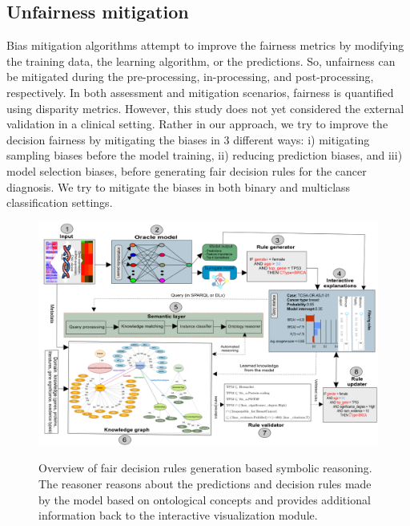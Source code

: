 \subsection{Unfairness mitigation}
Bias mitigation algorithms attempt to improve the fairness metrics by modifying the training data, the learning algorithm, or the predictions. So, unfairness can be mitigated during the pre-processing, in-processing, and post-processing, respectively.  
In both assessment and mitigation scenarios, fairness is quantified using disparity metrics. However, this study does not yet considered the external validation in a clinical setting. Rather in our approach, we try to improve the decision fairness by mitigating the biases in 3 different ways: i) mitigating sampling biases before the model training, ii) reducing prediction biases, and iii) model selection biases, before generating fair decision rules for the cancer diagnosis. We try to mitigate the biases in both binary and multiclass classification settings. 

\begin{figure}
	\centering
	\includegraphics[width=\linewidth]{images/reasoning_wf.png}
    \label{fig:nsreasoning}
	\caption[Overview of fair decision rules generation based symbolic reasoning]{Overview of fair decision rules generation based symbolic reasoning. The reasoner reasons about the predictions and decision rules made by the model based on ontological concepts and provides additional information back to the interactive visualization module.} 
	\vspace{-4mm}
\end{figure}


